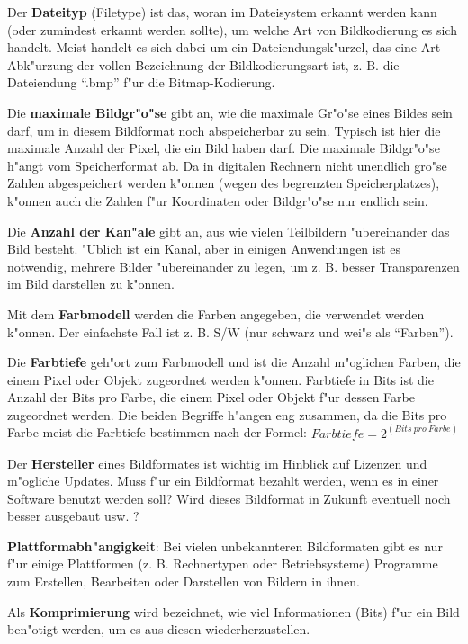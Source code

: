 Der \textbf{Dateityp} (Filetype) ist das, woran im Dateisystem erkannt werden kann (oder zumindest erkannt werden sollte), um welche Art von Bildkodierung es sich handelt. Meist handelt es sich dabei um ein Dateiendungsk"urzel, das eine Art Abk"urzung der vollen Bezeichnung der Bildkodierungsart ist, z. B. die Dateiendung ``.bmp'' f"ur die Bitmap-Kodierung.

\bigskip\noindent
Die \textbf{maximale Bildgr"o"se} gibt an, wie die maximale Gr"o"se eines Bildes sein darf, um in diesem Bildformat noch abspeicherbar zu sein. Typisch ist hier die maximale Anzahl der Pixel, die ein Bild haben darf.
Die maximale Bildgr"o"se h"angt vom Speicherformat ab. Da in digitalen Rechnern nicht unendlich gro"se Zahlen abgespeichert werden k"onnen (wegen des begrenzten Speicherplatzes), k"onnen auch die Zahlen f"ur Koordinaten oder Bildgr"o"se nur endlich sein.

\bigskip\noindent
Die \textbf{Anzahl der Kan"ale} gibt an, aus wie vielen Teilbildern "ubereinander das Bild besteht. "Ublich ist ein Kanal, aber in einigen Anwendungen ist es notwendig, mehrere Bilder "ubereinander zu legen, um z. B. besser Transparenzen im Bild darstellen zu k"onnen.

\bigskip\noindent
Mit dem \textbf{Farbmodell} werden die Farben angegeben, die verwendet werden k"onnen. Der einfachste Fall ist z. B. S/W (nur schwarz und wei"s als ``Farben'').

\bigskip\noindent
Die \textbf{Farbtiefe} geh"ort zum Farbmodell und ist die Anzahl m"oglichen Farben, die einem Pixel oder Objekt zugeordnet werden k"onnen.
Farbtiefe in Bits ist die Anzahl der Bits pro Farbe, die einem Pixel oder Objekt f"ur dessen Farbe zugeordnet werden.
Die beiden Begriffe h"angen eng zusammen, da die Bits pro Farbe meist die Farbtiefe bestimmen nach der Formel: $Farbtiefe = 2 ^ {(Bits\ pro\ Farbe)}$

\bigskip\noindent
Der \textbf{Hersteller} eines Bildformates ist wichtig im Hinblick auf Lizenzen und m"ogliche Updates. Muss f"ur ein Bildformat bezahlt werden, wenn es in einer Software benutzt werden soll? Wird dieses Bildformat in Zukunft eventuell noch besser ausgebaut usw. ?

\bigskip\noindent
\textbf{Plattformabh"angigkeit}: Bei vielen unbekannteren Bildformaten gibt es nur f"ur einige Plattformen (z. B. Rechnertypen oder Betriebsysteme) Programme zum Erstellen, Bearbeiten oder Darstellen von Bildern in ihnen.

\bigskip\noindent
Als \textbf{Komprimierung} wird bezeichnet, wie viel Informationen (Bits) f"ur ein Bild ben"otigt werden, um es aus diesen wiederherzustellen.

